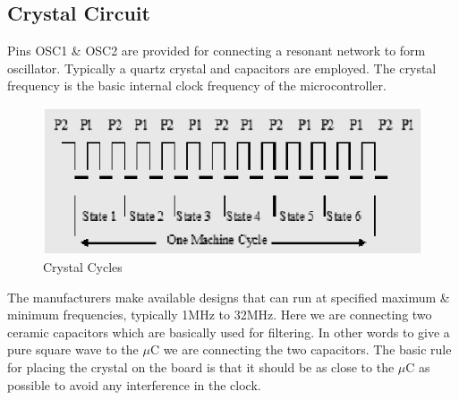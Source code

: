 \documentclass[12pt,a4paper,oneside,openright]{report}
\begin{document}
\subsection{Crystal Circuit}
Pins OSC1 \& OSC2 are provided for connecting a resonant network to form oscillator. Typically a quartz crystal and capacitors are employed. The crystal frequency is the basic internal clock frequency of the microcontroller.
\begin{figure}[!h]
 \centering
 \includegraphics[width = .60\textwidth]{Figures/21.jpg}
 \caption{Crystal Cycles}
 \label{Crystal Cycles}
\end{figure}
The manufacturers make available designs that can run at specified maximum \& minimum frequencies, typically 1MHz to 32MHz. Here we are connecting two ceramic capacitors which are basically used for filtering. In other words to give a pure square wave to the $\mu$C we are connecting the two capacitors. The basic rule for placing the crystal on the board is that it should be as close to the $\mu$C as possible to avoid any interference in the clock.
\end{document}
